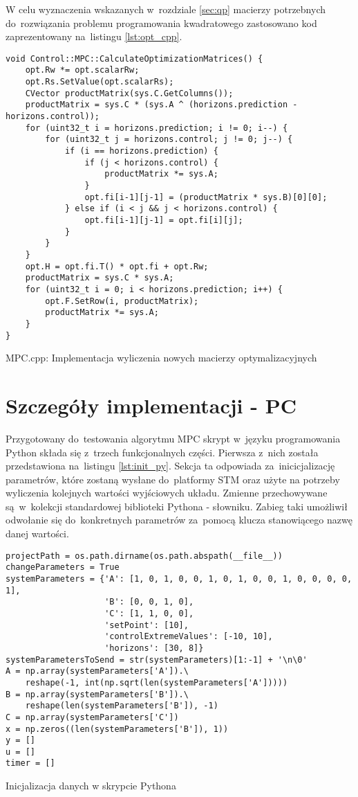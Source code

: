 W celu wyznaczenia wskazanych w~rozdziale \ref{sec:qp} macierzy potrzebnych do~rozwiązania
problemu programowania kwadratowego zastosowano kod zaprezentowany na~listingu \ref{lst:opt_cpp}.
\begin{listing}[htb]
\begin{verbatim}
void Control::MPC::CalculateOptimizationMatrices() {
    opt.Rw *= opt.scalarRw;
    opt.Rs.SetValue(opt.scalarRs);
    CVector productMatrix(sys.C.GetColumns());
    productMatrix = sys.C * (sys.A ^ (horizons.prediction - horizons.control));
    for (uint32_t i = horizons.prediction; i != 0; i--) {
        for (uint32_t j = horizons.control; j != 0; j--) {
            if (i == horizons.prediction) {
                if (j < horizons.control) {
                    productMatrix *= sys.A;
                }
                opt.fi[i-1][j-1] = (productMatrix * sys.B)[0][0];
            } else if (i < j && j < horizons.control) {
                opt.fi[i-1][j-1] = opt.fi[i][j];
            }
        }
    }
    opt.H = opt.fi.T() * opt.fi + opt.Rw;
    productMatrix = sys.C * sys.A;
    for (uint32_t i = 0; i < horizons.prediction; i++) {
        opt.F.SetRow(i, productMatrix);
        productMatrix *= sys.A;
    }
}
\end{verbatim}
\caption{MPC.cpp: Implementacja wyliczenia nowych macierzy optymalizacyjnych}
\label{lst:opt_cpp}
\end{listing}

\section{Szczegóły implementacji - PC} \label{sec:details-pc}
Przygotowany do~testowania algorytmu MPC skrypt w~języku programowania Python składa się z~trzech
funkcjonalnych części. Pierwsza z~nich została przedstawiona na~listingu \ref{lst:init_py}. Sekcja
ta odpowiada za~inicicjalizację parametrów, które zostaną wysłane do~platformy STM oraz użyte
na potrzeby wyliczenia kolejnych wartości wyjściowych układu. Zmienne przechowywane są~w~kolekcji
standardowej biblioteki Pythona - słowniku. Zabieg taki umożliwił odwołanie się do~konkretnych
parametrów za~pomocą klucza stanowiącego nazwę danej wartości. 

\begin{listing}[htb]
\begin{verbatim}
projectPath = os.path.dirname(os.path.abspath(__file__))
changeParameters = True
systemParameters = {'A': [1, 0, 1, 0, 0, 1, 0, 1, 0, 0, 1, 0, 0, 0, 0, 1],
                    'B': [0, 0, 1, 0],
                    'C': [1, 1, 0, 0],
                    'setPoint': [10],
                    'controlExtremeValues': [-10, 10],
                    'horizons': [30, 8]}
systemParametersToSend = str(systemParameters)[1:-1] + '\n\0'
A = np.array(systemParameters['A']).\
    reshape(-1, int(np.sqrt(len(systemParameters['A']))))
B = np.array(systemParameters['B']).\
    reshape(len(systemParameters['B']), -1)
C = np.array(systemParameters['C'])
x = np.zeros((len(systemParameters['B']), 1))
y = []
u = []
timer = []
\end{verbatim}
\caption{Inicjalizacja danych w skrypcie Pythona}
\label{lst:init_py}
\end{listing}

